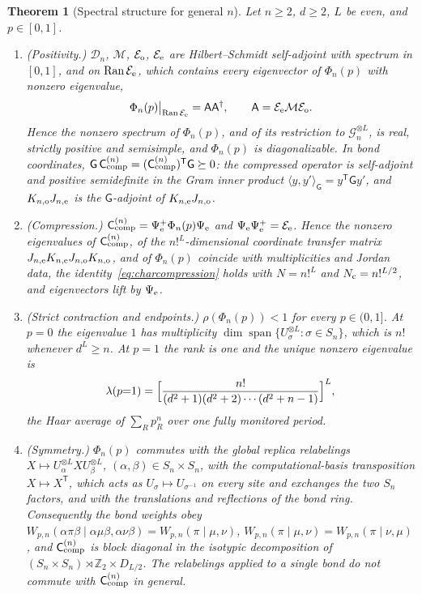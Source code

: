 \documentclass[aps,prx,reprint,superscriptaddress,nobibnotes,longbibliography]{revtex4-2}
\newtheorem{theorem}{Theorem}
\theoremstyle{remark}
\newcommand{\Ran}{\operatorname{Ran}}
\newcommand{\Ccomp}{\mathsf C_{\rm comp}}
\begin{document}
\begin{theorem}[Spectral structure for general $n$]
\label{thm:general-n}
Let $n\ge2$, $d\ge2$, $L$ be even, and $p\in[0,1]$.
\begin{enumerate}
\item[(i)] (Positivity.)  $\mathcal D_n$, $\mathcal M$, $\mathcal E_{\rm o}$, $\mathcal E_{\rm e}$ are Hilbert--Schmidt self-adjoint with spectrum in $[0,1]$, and on $\Ran\mathcal E_{\rm e}$, which contains every eigenvector of $\Phi_n(p)$ with nonzero eigenvalue,
\begin{equation}
 \Phi_n(p)\big|_{\Ran\mathcal E_{\rm e}}=\mathsf A\mathsf A^\dagger,\qquad \mathsf A=\mathcal E_{\rm e}\mathcal M\mathcal E_{\rm o}.
 \label{eq:AAdagger}
\end{equation}
Hence the nonzero spectrum of $\Phi_n(p)$, and of its restriction to $\mathcal G_n^{\otimes L}$, is real, strictly positive and semisimple, and $\Phi_n(p)$ is diagonalizable.  In bond coordinates, $\mathsf G\,\Ccomp^{(n)}=(\Ccomp^{(n)})^{\mathsf T}\mathsf G\succeq0$: the compressed operator is self-adjoint and positive semidefinite in the Gram inner product $\langle y,y'\rangle_{\mathsf G}=y^{\mathsf T}\mathsf Gy'$, and $K_{n,{\rm o}}J_{n,{\rm e}}$ is the $\mathsf G$-adjoint of $K_{n,{\rm e}}J_{n,{\rm o}}$.
\item[(ii)] (Compression.)  $\Ccomp^{(n)}=\Psi_{\rm e}^+\Phi_n(p)\Psi_{\rm e}$ and $\Psi_{\rm e}\Psi_{\rm e}^+=\mathcal E_{\rm e}$.  Hence the nonzero eigenvalues of $\Ccomp^{(n)}$, of the $n!^L$-dimensional coordinate transfer matrix $J_{n,{\rm e}}K_{n,{\rm e}}J_{n,{\rm o}}K_{n,{\rm o}}$, and of $\Phi_n(p)$ coincide with multiplicities and Jordan data, the identity~\eqref{eq:charcompression} holds with $N=n!^L$ and $N_{\rm c}=n!^{L/2}$, and eigenvectors lift by $\Psi_{\rm e}$.
\item[(iii)] (Strict contraction and endpoints.)  $\rho(\Phi_n(p))<1$ for every $p\in(0,1]$.  At $p=0$ the eigenvalue $1$ has multiplicity $\dim\operatorname{span}\{U_\sigma^{\otimes L}:\sigma\in S_n\}$, which is $n!$ whenever $d^L\ge n$.  At $p=1$ the rank is one and the unique nonzero eigenvalue is
\begin{equation}
 \lambda(p{=}1)=\Bigl[\frac{n!}{(d^2+1)(d^2+2)\cdots(d^2+n-1)}\Bigr]^{L},
 \label{eq:lambdap1}
\end{equation}
the Haar average of $\sum_Rp_R^n$ over one fully monitored period.
\item[(iv)] (Symmetry.)  $\Phi_n(p)$ commutes with the global replica relabelings $X\mapsto U_\alpha^{\otimes L}XU_\beta^{\otimes L}$, $(\alpha,\beta)\in S_n\times S_n$, with the computational-basis transposition $X\mapsto X^{\mathsf T}$, which acts as $U_\sigma\mapsto U_{\sigma^{-1}}$ on every site and exchanges the two $S_n$ factors, and with the translations and reflections of the bond ring.  Consequently the bond weights obey $W_{p,n}(\alpha\pi\beta\mid\alpha\mu\beta,\alpha\nu\beta)=W_{p,n}(\pi\mid\mu,\nu)$, $W_{p,n}(\pi\mid\mu,\nu)=W_{p,n}(\pi\mid\nu,\mu)$, and $\Ccomp^{(n)}$ is block diagonal in the isotypic decomposition of $(S_n\times S_n)\rtimes\mathbb Z_2\times D_{L/2}$.  The relabelings applied to a single bond do \emph{not} commute with $\Ccomp^{(n)}$ in general.

\end{enumerate}
\end{theorem}
\end{document}

